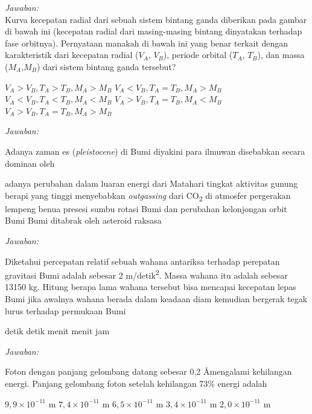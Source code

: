 \documentclass[11pt,fleqn]{exam}
\begin{document}
\begin{questions}
\textit{Jawaban: } \\

\question Kurva kecepatan radial dari sebuah sistem bintang ganda diberikan pada gambar di bawah ini (kecepatan radial dari masing-masing bintang dinyatakan terhadap fase orbitnya). Pernyataan manakah di bawah ini yang benar terkait dengan karakteristik dari kecepatan radial ($V_A$, $V_B$), periode orbital ($T_A$, $T_B$), dan massa ($M_A$,$M_B$) dari sistem bintang ganda tersebut?
\begin{choices}
\choice $V_A > V_B, T_A > T_B, M_A > M_B$
\choice $V_A < V_B, T_A = T_B, M_A > M_B$
\choice $V_A < V_B, T_A < T_B, M_A < M_B$
\choice $V_A > V_B, T_A = T_B, M_A < M_B$
\choice $V_A > V_B, T_A = T_B, M_A > M_B$
\end{choices}

\textit{Jawaban: }

\question Adanya zaman es (\textit{pleistocene}) di Bumi diyakini para ilmuwan disebabkan secara dominan oleh
\begin{choices}
\choice adanya perubahan dalam luaran energi dari Matahari
\choice tingkat aktivitas gunung berapi yang tinggi menyebabkan \textit{outgassing} dari CO\textsubscript{2} di atmosfer
\choice pergerakan lempeng benua
\choice presesi sumbu rotasi Bumi dan perubahan kelonjongan orbit Bumi
\choice Bumi ditabrak oleh asteroid raksasa
\end{choices}

\textit{Jawaban: } 



\question Diketahui percepatan relatif sebuah wahana antariksa terhadap perepatan gravitasi Bumi adalah sebesar 2 m/detik\textsuperscript{2}. Massa wahana itu adalah sebesar 13150 kg. Hitung berapa lama wahana tersebut bisa mencapai kecepatan lepas Bumi jika awalnya wahana berada dalam keadaan diam kemudian bergerak tegak lurus terhadap permukaan Bumi
\begin{choices}
 detik
 detik
 menit
 menit
 jam
\end{choices}

\textit{Jawaban: }

\question Foton dengan panjang gelombang datang sebesar 0,2 \AA mengalami kehilangan energi. Panjang gelombang foton setelah kehilangan 73\% energi adalah
\begin{choices}
\choice $9,9\times 10^{-11}$ m
\choice $7,4\times 10^{-11}$ m
\choice $6,5\times 10^{-11}$ m
\choice $3,4\times 10^{-11}$ m
\choice $2,0\times 10^{-11}$ m
\end{choices}


\end{questions}
\end{document}
